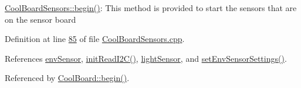 \hyperlink{class_cool_board_sensors_a97095823ef7c8f5290812f1405b966b3}{Cool\+Board\+Sensors\+::begin()}\+: This method is provided to start the sensors that are on the sensor board 

Definition at line \hyperlink{_cool_board_sensors_8cpp_source_l00085}{85} of file \hyperlink{_cool_board_sensors_8cpp_source}{Cool\+Board\+Sensors.\+cpp}.



References \hyperlink{_cool_board_sensors_8h_source_l00077}{env\+Sensor}, \hyperlink{_cool_board_sensors_8cpp_source_l00193}{init\+Read\+I2\+C()}, \hyperlink{_cool_board_sensors_8h_source_l00075}{light\+Sensor}, and \hyperlink{_cool_board_sensors_8cpp_source_l00391}{set\+Env\+Sensor\+Settings()}.



Referenced by \hyperlink{_cool_board_8cpp_source_l00021}{Cool\+Board\+::begin()}.


